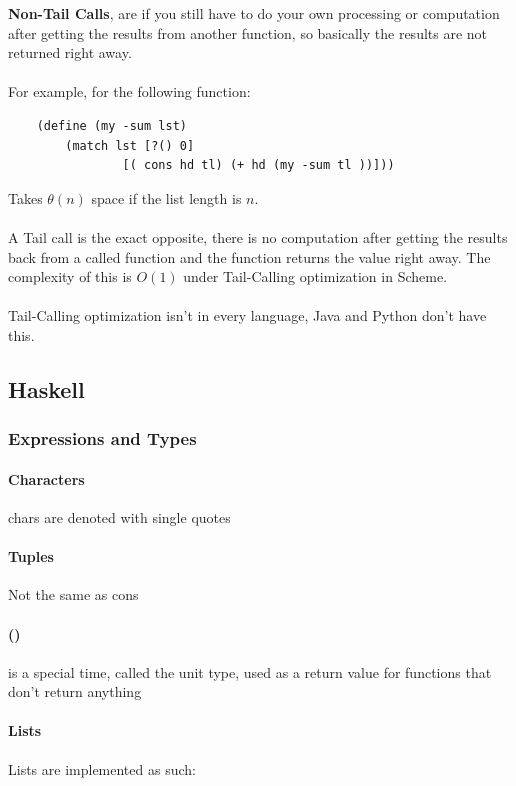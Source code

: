 \documentclass[12pt]{article}
\begin{document}
\textbf{Non-Tail Calls}, are if you still have to do your own processing or computation after getting the results from another function, so basically the results are not returned right away.
\\
\\
For example, for the following function:

\begin{lstlisting}
	(define (my -sum lst)
		(match lst [?() 0]
				[( cons hd tl) (+ hd (my -sum tl ))]))
\end{lstlisting}

Takes $\theta (n)$ space if the list length is $n$.\\
\\
A Tail call is the exact opposite, there is no computation after getting the results back from a called function and the function returns the value right away. The complexity of this is $O(1)$ under Tail-Calling optimization in Scheme.\\
\\
Tail-Calling optimization isn't in every language, Java and Python don't have this.

\subsection{Haskell}

\subsubsection{Expressions and Types}

\paragraph{Characters} chars are denoted with single quotes

\paragraph{Tuples} Not the same as cons

\paragraph{()} is a special time, called the unit type, used as a return value for functions that don't return anything

\paragraph{Lists} Lists are implemented as such:
\end{document}
